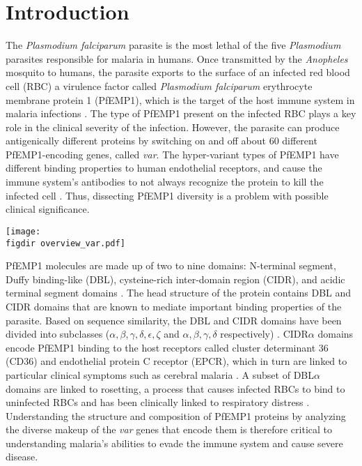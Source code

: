 \documentclass[10pt,twocolumn,superscriptaddress]{revtex4-1}
\newcommand{\dieumycom}[1]{[\textcolor{ForestGreen}{DM: #1}]}
\newcommand{\var}{{\it var}\xspace}
\newcommand{\dbla}{{DBL$\alpha$}\xspace}
\newcommand{\cidra}{{CIDR$\alpha$}\xspace}
\newcommand{\figdir}{figures/}
\begin{document}
\section{Introduction} 
The \textit{Plasmodium falciparum} parasite is the most lethal of the five \textit{Plasmodium} parasites responsible for malaria in humans. Once transmitted by the \textit{Anopheles} mosquito to humans, the parasite exports to the surface of an infected red blood cell (RBC) a virulence factor called \textit{Plasmodium falciparum} erythrocyte membrane protein 1 (PfEMP1), which is the target of the host immune system in malaria infections \cite{chan2012}. The type of PfEMP1 present on the infected RBC plays a key role in the clinical severity of the infection. However, the parasite can produce antigenically different proteins by switching on and off about 60 different PfEMP1-encoding genes, called \var \cite{gardner2002}. The hyper-variant types of PfEMP1 have different binding properties to human endothelial receptors, and cause the immune system's antibodies to not always recognize the protein to kill the infected cell \cite{gardner2002}. Thus, dissecting PfEMP1 diversity is a problem with possible clinical significance. 

\begin{figure*}[t]
	\centering
	\texttt{[image: \\figdir overview\_var.pdf]}
	\caption{ \dieumycom{Overview of PfEMP1, the \textit{Plasmodium falciparum} virulence factor encoded by \textit{var} genes. } }
	\label{overview}
\end{figure*}


PfEMP1 molecules are made up of two to nine domains: N-terminal segment, Duffy binding-like (DBL), cysteine-rich inter-domain region (CIDR), and acidic terminal segment domains \cite{rask2010}. The head structure of the protein contains DBL and CIDR domains that are known to mediate important binding properties of the parasite. Based on sequence similarity, the DBL and CIDR domains have been divided into subclasses ($\alpha, \beta, \gamma, \delta, \epsilon , \zeta$ and $\alpha, \beta, \gamma, \delta$ respectively) \cite{rask2010} . \cidra domains encode PfEMP1 binding to the host receptors called cluster determinant 36 (CD36) and endothelial protein C receptor (EPCR), which in turn are linked to particular clinical symptoms such as cerebral malaria \cite{hsieh2016}. A subset of \dbla domains are linked to rosetting, a process that causes infected RBCs to bind to uninfected RBCs and has been clinically linked to respiratory distress \cite{lau2015}. Understanding the structure and composition of PfEMP1 proteins by analyzing the diverse makeup of the \var genes that encode them is therefore critical to understanding malaria's abilities to evade the immune system and cause severe disease. 
\end{document}
